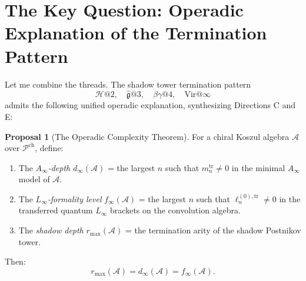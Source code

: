 \documentclass[11pt]{article}
\theoremstyle{definition}
\newtheorem{proposal}{Proposal}
\theoremstyle{remark}
\newcommand{\Pch}{\mathcal{P}^{\mathrm{ch}}}
\newcommand{\Heis}{\mathcal{H}}
\newcommand{\Vir}{\mathrm{Vir}}
\newcommand{\cA}{\mathcal{A}}
\begin{document}
\section{The Key Question: Operadic Explanation of the Termination
Pattern}

Let me combine the threads.  The shadow tower termination pattern
\[
\Heis @2, \quad
\widehat{\mathfrak{g}} @3, \quad
\beta\gamma @4, \quad
\Vir @\infty
\]
admits the following unified operadic explanation, synthesizing
Directions C and E:

\begin{proposal}[The Operadic Complexity Theorem]
\label{prop:operadic-complexity}
For a chiral Koszul algebra $\cA$ over $\Pch$, define:
\begin{enumerate}
\item The \emph{$A_\infty$-depth} $d_\infty(\cA)$ = the largest
$n$ such that $m_n^{\mathrm{tr}} \neq 0$ in the minimal
$A_\infty$ model of $\cA$.
\item The \emph{$L_\infty$-formality level} $f_\infty(\cA)$ = the
largest $n$ such that $\ell_n^{(0),\mathrm{tr}} \neq 0$ in the
transferred quantum $L_\infty$ brackets on the convolution algebra.
\item The \emph{shadow depth} $r_{\max}(\cA)$ = the termination
arity of the shadow Postnikov tower.
\end{enumerate}

Then:
\[
r_{\max}(\cA) = d_\infty(\cA) = f_\infty(\cA).
\]
\end{proposal}
\end{document}
